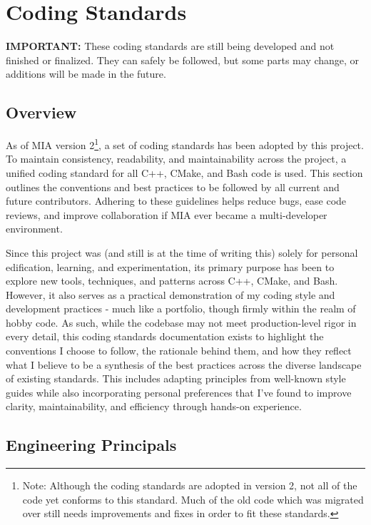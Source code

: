 \chapter{Coding Standards} \label{ch:coding-standards}
\pagestyle{fancy}

\textbf{IMPORTANT:} These coding standards are still being developed and not finished or finalized. They can safely be followed, but some parts may change, or additions will be made in the future.

\section{Overview}

As of MIA version 2\footnote{Note: Although the coding standards are adopted in version 2, not all of the code yet conforms to this standard. Much of the old code which was migrated over still needs improvements and fixes in order to fit these standards.}, a set of coding standards has been adopted by this project. To maintain consistency, readability, and maintainability across the project, a unified coding standard for all C++, CMake, and Bash code is used. This section outlines the conventions and best practices to be followed by all current and future contributors. Adhering to these guidelines helps reduce bugs, ease code reviews, and improve collaboration if MIA ever became a multi-developer environment.

Since this project was (and still is at the time of writing this) solely for personal edification, learning, and experimentation, its primary purpose has been to explore new tools, techniques, and patterns across C++, CMake, and Bash. However, it also serves as a practical demonstration of my coding style and development practices - much like a portfolio, though firmly within the realm of hobby code. As such, while the codebase may not meet production-level rigor in every detail, this coding standards documentation exists to highlight the conventions I choose to follow, the rationale behind them, and how they reflect what I believe to be a synthesis of the best practices across the diverse landscape of existing standards. This includes adapting principles from well-known style guides while also incorporating personal preferences that I’ve found to improve clarity, maintainability, and efficiency through hands-on experience.







\section{Engineering Principals}

